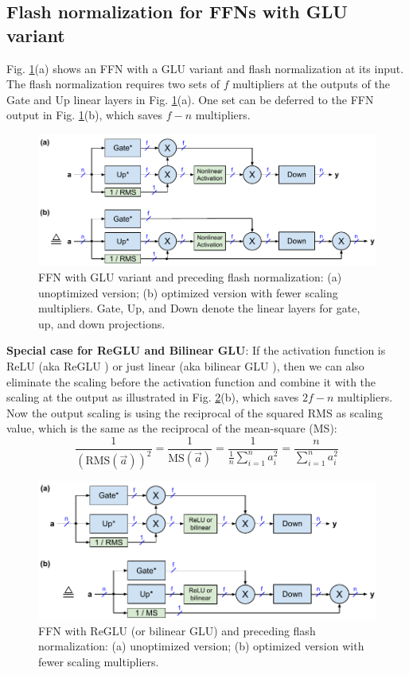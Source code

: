 \documentclass{article}
\def\rms{\text{RMS}(\vec{a})}         %
\def\f1n{\frac{1}{n}}                 %
\def\sas{\sum_{i=1}^n a_i^2}           %
\def\a{\vec{a}}                       %
\begin{document}
\subsection{Flash normalization for FFNs with GLU variant}
Fig. \ref{fig3}(a) shows an FFN with a GLU variant \citep{GLU} and flash normalization at its input. The flash normalization requires two sets of $f$ multipliers at the outputs of the Gate and Up linear layers in Fig. \ref{fig3}(a). One set can be deferred to the FFN output in Fig. \ref{fig3}(b), which saves $f - n$ multipliers.
\begin{figure}[h!] \centering
  \includegraphics[scale=0.9]{../doc/fig/flashNorm_fig3.pdf}
  \caption{FFN with GLU variant and preceding flash normalization: (a) unoptimized version; (b) optimized version with fewer scaling multipliers. Gate, Up, and Down denote the linear layers for gate, up, and down projections.}
\label{fig3} \end{figure}

\textbf{Special case for ReGLU and Bilinear GLU}: If the activation function is ReLU (aka ReGLU \citep{GLU}) or just linear (aka bilinear GLU \citep{GLU}), then we can also eliminate the scaling before the activation function and combine it with the scaling at the output as illustrated in Fig. \ref{fig4}(b), which saves $2f - n$ multipliers. Now the output scaling is using the reciprocal of the squared RMS as scaling value, which is the same as the reciprocal of the mean-square (MS):
\begin{equation*}
  \frac{1}{(\rms)^2} = \frac{1}{\text{MS}(\a)}
  = \frac{1}{\f1n \sas} = \frac{n}{\sas}
\end{equation*}

\begin{figure}[h!] \centering
  \includegraphics[scale=0.9]{../doc/fig/flashNorm_fig4.pdf}
  \caption{FFN with ReGLU (or bilinear GLU) and preceding flash normalization: (a) unoptimized version; (b) optimized version with fewer scaling multipliers.}
\label{fig4} \end{figure}
\end{document}
